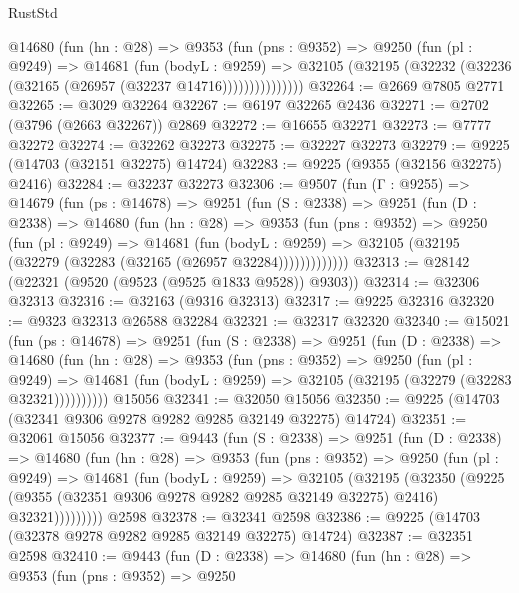 \begin{lexlean}{RustStd}
\begin{coremodule}
            @14680
              (fun (hn : @28) =>
              @9353
                (fun (pns : @9352) =>
                @9250
                  (fun (pl : @9249) =>
                  @14681
                    (fun (bodyL : @9259) =>
                    @32105 (@32195 (@32232 (@32236 (@32165 (@26957 (@32237 @14716)))))))))))))))
@32264 := @2669 @7805 @2771
@32265 := @3029 @32264
@32267 := @6197 @32265 @2436
@32271 := @2702 (@3796 (@2663 @32267)) @2869
@32272 := @16655 @32271
@32273 := @7777 @32272
@32274 := @32262 @32273
@32275 := @32227 @32273
@32279 := @9225 (@14703 (@32151 @32275) @14724)
@32283 := @9225 (@9355 (@32156 @32275) @2416)
@32284 := @32237 @32273
@32306 := @9507
    (fun (Γ : @9255) =>
    @14679
      (fun (ps : @14678) =>
      @9251
        (fun (S : @2338) =>
        @9251
          (fun (D : @2338) =>
          @14680
            (fun (hn : @28) =>
            @9353
              (fun (pns : @9352) =>
              @9250
                (fun (pl : @9249) =>
                @14681
                  (fun (bodyL : @9259) =>
                  @32105 (@32195 (@32279 (@32283 (@32165 (@26957 @32284)))))))))))))
@32313 := @28142 (@22321 (@9520 (@9523 (@9525 @1833 @9528)) @9303))
@32314 := @32306 @32313
@32316 := @32163 (@9316 @32313)
@32317 := @9225 @32316
@32320 := @9323 @32313 @26588 @32284
@32321 := @32317 @32320
@32340 := @15021
    (fun (ps : @14678) =>
    @9251
      (fun (S : @2338) =>
      @9251
        (fun (D : @2338) =>
        @14680
          (fun (hn : @28) =>
          @9353
            (fun (pns : @9352) =>
            @9250
              (fun (pl : @9249) =>
              @14681 (fun (bodyL : @9259) => @32105 (@32195 (@32279 (@32283 @32321))))))))))
    @15056
@32341 := @32050 @15056
@32350 := @9225 (@14703 (@32341 @9306 @9278 @9282 @9285 @32149 @32275) @14724)
@32351 := @32061 @15056
@32377 := @9443
    (fun (S : @2338) =>
    @9251
      (fun (D : @2338) =>
      @14680
        (fun (hn : @28) =>
        @9353
          (fun (pns : @9352) =>
          @9250
            (fun (pl : @9249) =>
            @14681
              (fun (bodyL : @9259) =>
              @32105
                (@32195
                  (@32350
                    (@9225
                      (@9355 (@32351 @9306 @9278 @9282 @9285 @32149 @32275) @2416)
                      @32321)))))))))
    @2598
@32378 := @32341 @2598
@32386 := @9225 (@14703 (@32378 @9278 @9282 @9285 @32149 @32275) @14724)
@32387 := @32351 @2598
@32410 := @9443
    (fun (D : @2338) =>
    @14680
      (fun (hn : @28) =>
      @9353
        (fun (pns : @9352) =>
        @9250

\end{coremodule}
\end{lexlean}
